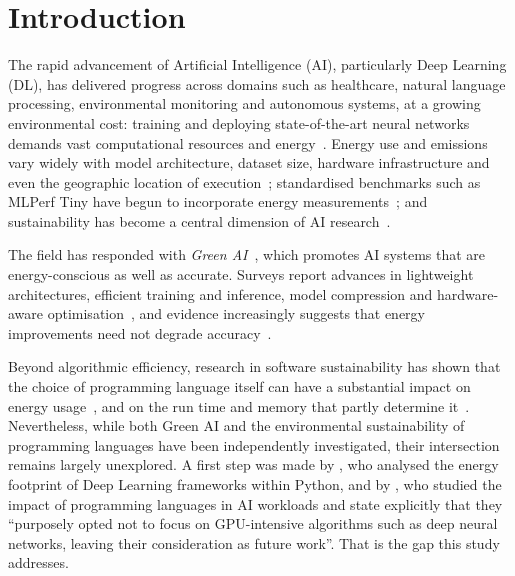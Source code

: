 \section{Introduction}
\label{sec:intro}

The rapid advancement of Artificial Intelligence (AI), particularly Deep Learning (DL), has delivered progress across domains such as healthcare, natural language processing, environmental monitoring and autonomous systems, at a growing environmental cost: training and deploying state-of-the-art neural networks demands vast computational resources and energy~\citep{strubell2019energy,lacoste2019quantifying,bender2021stochastic,xu2021survey,patterson2021carbon,luccioni2023counting,kaack2022aligning}.
Energy use and emissions vary widely with model architecture, dataset size, hardware infrastructure and even the geographic location of execution~\citep{patterson2022plateau,luccioni2022bloom}; standardised benchmarks such as MLPerf Tiny have begun to incorporate energy measurements~\citep{banbury2021mlperf}; and sustainability has become a central dimension of AI research~\citep{henderson2020systematic,schwartz2020green}.

The field has responded with \emph{Green AI}~\citep{schwartz2020green,verdecchia2023systematic}, which promotes AI systems that are energy-conscious as well as accurate. Surveys report advances in lightweight architectures, efficient training and inference, model compression and hardware-aware optimisation~\citep{xu2021survey,mehlin2023towards,tripp2024measuring,yarally2023uncovering}, and evidence increasingly suggests that energy improvements need not degrade accuracy~\citep{cruz2025greening}.

Beyond algorithmic efficiency, research in software sustainability has shown that the choice of programming language itself can have a substantial impact on energy usage~\citep{pereira2021ranking,georgiou2017analyzing,pereira2017energy,gordillo2024ranking,chandra2019impact,mahadevappa2021energy,maleki2017understanding}, and on the run time and memory that partly determine it~\citep{nanz2015comparative}. Nevertheless, while both Green AI and the environmental sustainability of programming languages have been independently investigated, their intersection remains largely unexplored.
A first step was made by \citet{georgiou2022green}, who analysed the energy footprint of Deep Learning frameworks within Python, and by \citet{marini2025green}, who studied the impact of programming languages in AI workloads and state explicitly that they ``purposely opted not to focus on GPU-intensive algorithms such as deep neural networks, leaving their consideration as future work''. That is the gap this study addresses.

